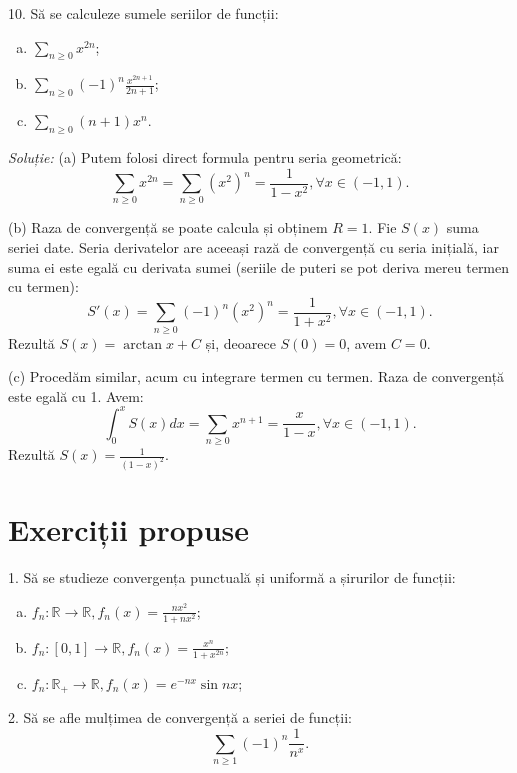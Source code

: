\documentclass[11pt,a4paper]{article}
\newcommand\ds{\displaystyle}
\newcommand\RR{\mathbb{R}}
\theoremstyle{dotless}
\theoremstyle{dotlessdr}
\begin{document}
\vspace{1cm}

10. Să se calculeze sumele seriilor de funcții:
\begin{enumerate}[(a)]
\item $\ds\sum_{n \geq 0} x^{2n}$;
\item $\ds\sum_{n \geq 0} (-1)^n \frac{x^{2n + 1}}{2n + 1}$;
\item $\ds\sum_{n \geq 0} (n + 1)x^n$.
\end{enumerate}

\emph{Soluție:} (a) Putem folosi direct formula pentru seria geometrică:
\[
  \sum_{n \geq 0} x^{2n} = \sum_{n \geq 0} (x^2)^n = \frac{1}{1 - x^2}, %
  \forall x \in (-1, 1).
\]

(b) Raza de convergență se poate calcula și obținem $R = 1$. Fie $S(x)$ suma seriei
date. Seria derivatelor are aceeași rază de convergență cu seria inițială, iar
suma ei este egală cu derivata sumei (seriile de puteri se pot deriva mereu termen
cu termen):
\[
  S'(x) = \sum_{n \geq 0} (-1)^n (x^2)^n = \frac{1}{1 + x^2}, \forall x \in (-1, 1).
\]
Rezultă $S(x) = \arctan x + C$ și, deoarece $S(0) = 0$, avem $C = 0$.

(c) Procedăm similar, acum cu integrare termen cu termen. Raza de convergență
este egală cu 1. Avem:
\[
  \int_0^x S(x) dx = \sum_{n \geq 0} x^{n + 1} = \frac{x}{1 - x}, \forall x \in (-1, 1).
\]
Rezultă $S(x) = \frac{1}{(1 - x)^2}$.


\section{Exerciții propuse}
\label{sec:ex}

1. Să se studieze convergența punctuală și uniformă a șirurilor de funcții:
\begin{enumerate}[(a)]
\item $f_n : \RR \to \RR, f_n(x) = \frac{nx^2}{1 + nx^2}$;
\item $f_n : [0, 1] \to \RR, f_n(x) = \frac{x^n}{1 + x^{2n}}$;
\item $f_n : \RR_+ \to \RR, f_n(x) = e^{-nx} \sin nx$;
\end{enumerate}

\vspace{1cm}

2. Să se afle mulțimea de convergență a seriei de funcții:
\[
  \sum_{n \geq 1} (-1)^n \frac{1}{n^x}.
\]
\end{document}
